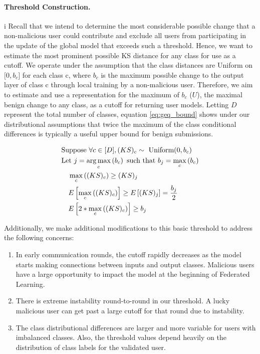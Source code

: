 \documentclass{article} %
\begin{document}
\paragraph{Threshold Construction.} i Recall that we intend to determine the most considerable possible change that a non-malicious user could contribute and exclude all users from participating in the update of the global model that exceeds such a threshold. Hence, we want to estimate the most prominent possible KS distance for any class for use as a cutoff. We operate under the assumption that the class distances are Uniform on $\mathopen[0, b_c\mathclose]$ for each class c, where $b_c$ is the maximum possible change to the output layer of class c through local training by a non-malicious user. Therefore, we aim to estimate and use a representation for the maximum of $b_c$ ($U$), the maximal benign change to any class, as a cutoff for returning user models. Letting $D$ represent the total number of classes, equation \ref{eq:geq_bound} shows under our distributional assumptions that twice the maximum of the class conditional differences is typically a useful upper bound for benign submissions.

\begin{align}
    & \textrm{Suppose } \forall c \in \mathopen[ D \mathclose], (KS)_c \sim \textrm{ Uniform}(0, b_c) \nonumber \\
    & \textrm{Let } j = \operatorname*{arg\,max}_c \left( b_c \right) \textrm{ such that } b_j = \max_c \left( b_c \right) \nonumber \\
    & \quad \max_c \left( (KS)_c \right) \geq (KS)_j \nonumber \\
    & \quad E \left[ \max_c \left( (KS)_c \right) \right] \geq E \left[ (KS)_j \right] = \dfrac{b_j}{2} \nonumber \\
    & \quad E \left[ 2 * \max_c \left( (KS)_c \right) \right] \geq b_j \label{eq:geq_bound} 
\end{align}

Additionally, we make additional modifications to this basic threshold to address the following concerns:
\begin{enumerate}
    \item In early communication rounds, the cutoff rapidly decreases as the model starts making connections between inputs and output classes. Malicious users have a large opportunity to impact the model at the beginning of Federated Learning.
    \item There is extreme instability round-to-round in our threshold. A lucky malicious user can get past a large cutoff for that round due to instability.
    \item The class distributional differences are larger and more variable for users with imbalanced classes. Also, the threshold values depend heavily on the distribution of class labels for the validated user.
\end{enumerate}
\end{document}

